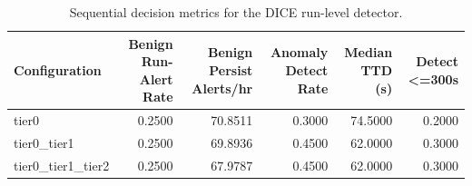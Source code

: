 \begin{table}[t]
\centering
\caption{Sequential decision metrics for the DICE run-level detector.}
\label{tab:dice_sequential_metrics}
\footnotesize
\begin{tabular}{lrrrrr}
\toprule
Configuration & Benign Run-Alert Rate & Benign Persist Alerts/hr & Anomaly Detect Rate & Median TTD (s) & Detect <=300s \\
\midrule
tier0 & 0.2500 & 70.8511 & 0.3000 & 74.5000 & 0.2000 \\
tier0_tier1 & 0.2500 & 69.8936 & 0.4500 & 62.0000 & 0.3000 \\
tier0_tier1_tier2 & 0.2500 & 67.9787 & 0.4500 & 62.0000 & 0.3000 \\
\bottomrule
\end{tabular}

\end{table}
